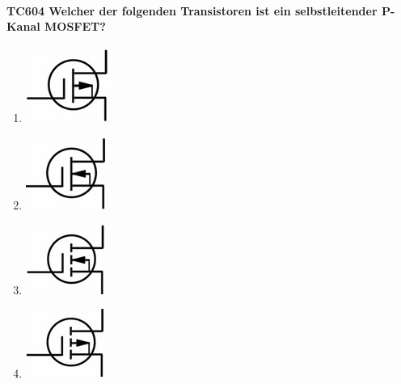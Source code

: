 \documentclass[8pt]{article}
\begin{document}
\begin{enumerate}
\begin{enumerate}[nolistsep,label=\Alph*]
{\begin{enumerate}[nolistsep,label=\Alph*]
\paragraph*{TC604 Welcher der folgenden Transistoren ist ein selbstleitender P-Kanal MOSFET?}
\begin{enumerate}[nolistsep,label=\Alph*]
\item
	\begin{center}
		\begin{minipage}{\linewidth}
			\centering
			\includegraphics[scale=1.0]{pics/tc604_a.jpg}
		\end{minipage}
	\end{center}
\item
	\begin{center}
		\begin{minipage}{\linewidth}
			\centering
			\includegraphics[scale=1.0]{pics/tc604_b.jpg}
		\end{minipage}
	\end{center}
\item
	\begin{center}
		\begin{minipage}{\linewidth}
			\centering
			\includegraphics[scale=1.0]{pics/tc604_c.jpg}
		\end{minipage}
	\end{center}
\item
	\begin{center}
		\begin{minipage}{\linewidth}
			\centering
			\includegraphics[scale=1.0]{pics/tc604_d.jpg}
		\end{minipage}
	\end{center}
\end{enumerate}


\end{enumerate}}
\end{enumerate}
\end{enumerate}
\end{document}

